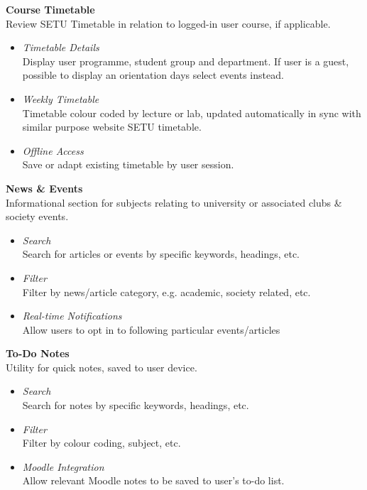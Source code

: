   
\textbf{Course Timetable}\\
Review SETU Timetable in relation to logged-in user course, if applicable.
\begin{itemize}
  \item \textit{Timetable Details}\\
        Display user programme, student group and department. If user is a guest, possible to display an orientation days select events instead.
  \item \textit{Weekly Timetable}\\
        Timetable colour coded by lecture or lab, updated automatically in sync with similar purpose website SETU timetable.
  \item \textit{Offline Access}\\
        Save or adapt existing timetable by user session. 
  \end{itemize}


\textbf{News \& Events}\\
     Informational section for subjects relating to university or associated clubs \& society events.
\begin{itemize}
  \item \textit{Search}\\
        Search for articles or events by specific keywords, headings, etc.
  \item \textit{Filter}\\
       Filter by news/article category, e.g. academic, society related, etc.
  \item \textit{Real-time Notifications}\\
       Allow users to opt in to following particular events/articles 
  \end{itemize}

\textbf{To-Do Notes}\\
     Utility for quick notes, saved to user device.
\begin{itemize}
  \item \textit{Search}\\
        Search for notes by specific keywords, headings, etc.
  \item \textit{Filter}\\
       Filter by colour coding, subject, etc.
  \item \textit{Moodle Integration}\\
       Allow relevant Moodle notes to be saved to user's to-do list.
  \end{itemize}

